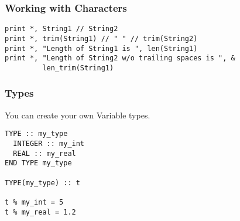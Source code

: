 \begin{frame}[fragile]
  \frametitle{Working with Characters}

  \begin{lstlisting}
print *, String1 // String2
print *, trim(String1) // " " // trim(String2)
print *, "Length of String1 is ", len(String1)
print *, "Length of String2 w/o trailing spaces is ", &
         len_trim(String1)
  \end{lstlisting}

\end{frame}

\begin{frame}[fragile]
  \frametitle{Types}

  You can create your own Variable types.

  \begin{lstlisting}
TYPE :: my_type
  INTEGER :: my_int
  REAL :: my_real
END TYPE my_type

TYPE(my_type) :: t

t % my_int = 5
t % my_real = 1.2
  \end{lstlisting}

\end{frame}
